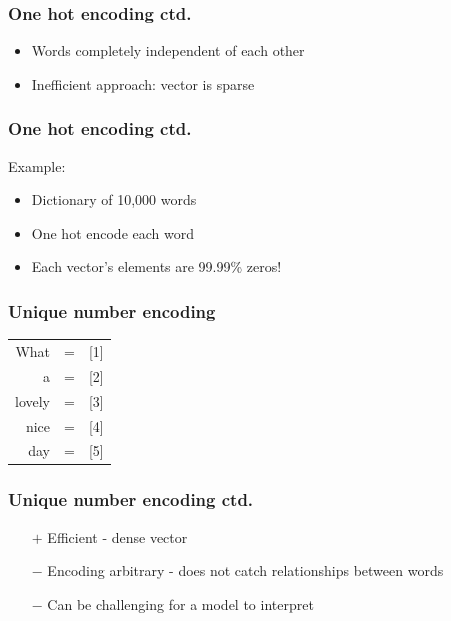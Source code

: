 \begin{frame}
\frametitle{One hot encoding ctd.}

	\begin{itemize}
		\item Words completely independent of each other
		\item Inefficient approach: vector is sparse
	\end{itemize}

\end{frame}

\begin{frame}
\frametitle{One hot encoding ctd.}

	Example:
	\begin{itemize}
		\item Dictionary of 10,000 words
		\item One hot encode each word
		\item Each vector's elements are 99.99\% zeros!
		
	\end{itemize}

\end{frame}

\begin{frame}
\frametitle{Unique number encoding}

\begin{table}[h]
	\hspace{15mm}
	\huge
	\begin{tabular}{rcl}
		What & = & [1] \\
		a & = & [2]\\
		lovely & = & [3]\\
		nice & = & [4]\\
		day & = & [5]\\
	\end{tabular}
\end{table}


\end{frame}

\begin{frame}
\frametitle{Unique number encoding ctd.}

	\begin{itemize}
		\item[$+$] Efficient - dense vector
		\item[$-$] Encoding arbitrary - does not catch relationships between words
		\item[$-$] Can be challenging for a model to interpret
	\end{itemize}

\end{frame}

